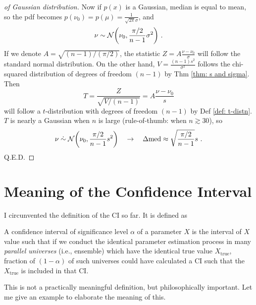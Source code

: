 \begin{proof}[of Gaussian distribution]
Now if $ p(x) $ is a Gaussian, median is equal to mean, so the pdf becomes $ p(\nu_0) = p(\mu) = \frac{1}{\sqrt{2\pi} \sigma} $, and
\begin{equation*}
  \nu \sim \mathcal{N} \qty( \nu_0, \frac{\pi / 2}{n - 1} \sigma^2 ) ~.
\end{equation*}
If we denote $ A = \sqrt{(n - 1) / (\pi / 2)} $, the statistic $ Z = A \frac{\nu - \nu_0}{\sigma} $ will follow the standard normal distribution. On the other hand, $ V = \frac{(n - 1) s^2}{\sigma^2} $ follows the chi-squared distribution of degrees of freedom $ (n - 1) $ by Thm \ref{thm: s and sigma}. Then 
\begin{equation*}
  T = \frac{Z}{\sqrt{V / (n - 1)}}
    = A \frac{\nu - \nu_0}{s}
\end{equation*}
will follow a $ t $-distribution with degrees of freedom $ (n - 1) $ by Def \ref{def: t-distn}. $ T $ is nearly a Gaussian when $ n $ is large (rule-of-thumb: when $ n \gtrsim 30 $), so 
\begin{equation}
  \nu \mathrel{\dot{\sim}} \mathcal{N} \qty( \nu_0, \frac{\pi / 2}{n - 1} s^2 )
  \quad\rightarrow \quad
  \Delta \mathrm{med} \approx \sqrt{\frac{\pi / 2}{n - 1}} s  ~.
\end{equation}
Q.E.D.
\end{proof}



\section{Meaning of the Confidence Interval}
I circunvented the definition of the CI so far. It is defined as

\begin{defn} 
  A confidence interval of significance level $ \alpha $ of a parameter $ X $ is the interval of $ X $ value such that if we conduct the identical parameter estimation process in many \textit{parallel universes} (i.e., ensemble) which have the identical true value $ X_\mathrm{true} $, fraction of $ (1 - \alpha) $ of such universes could have calculated a CI such that the $ X_\mathrm{true} $ is included in that CI.
\end{defn}

This is not a practically meaningful definition, but philosophically important. Let me give an example to elaborate the meaning of this.

